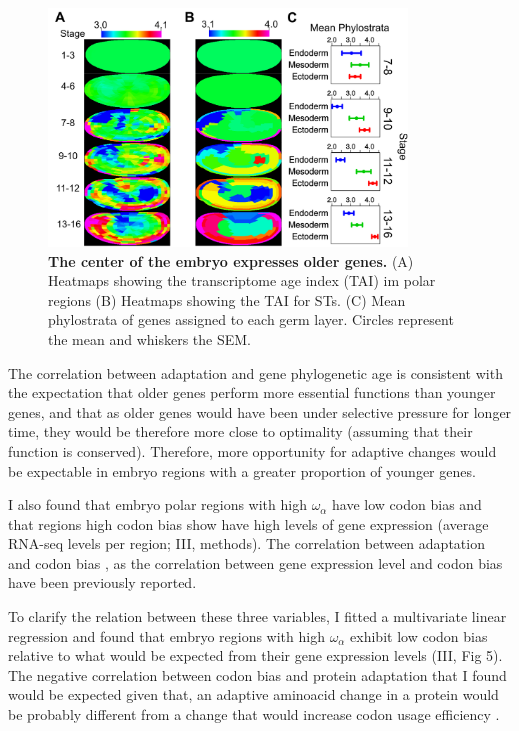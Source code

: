 %
\begin{figure}[t]
  \includegraphics[width=0.85\textwidth]{./Images/Art-III/TAI.png}
  \centering
  \caption{\textbf{The center of the embryo expresses older genes.}
   (A) Heatmaps showing the transcriptome age index (TAI) im polar regions (B) Heatmaps showing the TAI for STs. (C) Mean phylostrata of genes assigned to each germ layer. Circles represent the mean and whiskers the SEM.
  }
  \label{fig:Art-III-TAI}
\end{figure}
%
The correlation between adaptation and gene phylogenetic age is consistent with the expectation that older genes perform more essential functions than younger genes, and that as older genes would have been under selective pressure for longer time, they would be therefore more close to optimality (assuming that their function is conserved).
Therefore, more opportunity for adaptive changes would be expectable in embryo regions with a greater proportion of younger genes.

I also found that embryo polar regions with high $\omega_{\alpha}$ have low codon bias and that regions high codon bias show have high levels of gene expression (average RNA-seq levels per region; III, methods). 
The correlation between adaptation and codon bias \citep{Sharp1991,Betancourt2002,Haerty2007}, as the  correlation between gene expression level and codon bias \citep{Plotkin2011} have been previously reported.   

To clarify the relation between these three variables, I fitted a multivariate linear regression and found that embryo regions with high $\omega_{\alpha}$ exhibit low codon bias relative to what would be expected from their gene expression levels (III, Fig 5).
The negative correlation between codon bias and protein adaptation that I found would be expected given that, an adaptive  aminoacid change in a protein would be probably different from a change that would increase codon usage efficiency \citep{Hershberg2008,Presnyak2015}.

